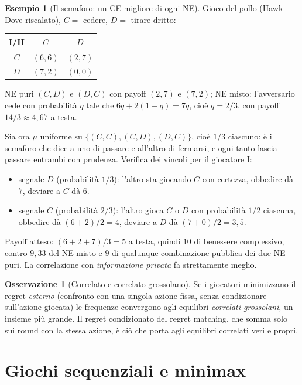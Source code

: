 \documentclass[12pt,a4paper,twoside]{book}
\theoremstyle{plain}
\theoremstyle{definition}
\newtheorem{example}[theorem]{Esempio}
\newtheorem{remark}[theorem]{Osservazione}
\begin{document}
\begin{example}[Il semaforo: un CE migliore di ogni NE]
Gioco del pollo (Hawk-Dove riscalato), $C=$ cedere, $D=$ tirare dritto:
\begin{center}
\begin{tabular}{c|cc}
I/II & $C$ & $D$\\\hline
$C$ & $(6,6)$ & $(2,7)$\\
$D$ & $(7,2)$ & $(0,0)$
\end{tabular}
\end{center}
NE puri $(C,D)$ e $(D,C)$ con payoff $(2,7)$ e $(7,2)$; NE misto: l'avversario
cede con probabilità $q$ tale che $6q+2(1-q)=7q$, cioè $q=2/3$, con payoff
$14/3\approx 4{,}67$ a testa.

Sia ora $\mu$ uniforme su $\{(C,C),(C,D),(D,C)\}$, cioè $1/3$ ciascuno: è il
semaforo che dice a uno di passare e all'altro di fermarsi, e ogni tanto lascia
passare entrambi con prudenza. Verifica dei vincoli per il giocatore I:
\begin{itemize}
  \item segnale $D$ (probabilità $1/3$): l'altro sta giocando $C$ con certezza,
        obbedire dà $7$, deviare a $C$ dà $6$. \checkmark
  \item segnale $C$ (probabilità $2/3$): l'altro gioca $C$ o $D$ con probabilità
        $1/2$ ciascuna, obbedire dà $(6+2)/2=4$, deviare a $D$ dà $(7+0)/2=3{,}5$.
        \checkmark
\end{itemize}
Payoff atteso: $(6+2+7)/3=5$ a testa, quindi $10$ di benessere complessivo, contro
$9{,}33$ del NE misto e $9$ di qualunque combinazione pubblica dei due NE puri.
La correlazione con \emph{informazione privata} fa strettamente meglio.
\end{example}

\begin{remark}[Correlato e correlato grossolano]
Se i giocatori minimizzano il regret \emph{esterno} (confronto con una singola
azione fissa, senza condizionare sull'azione giocata) le frequenze convergono agli
equilibri \emph{correlati grossolani}, un insieme più grande. Il regret
condizionato del regret matching, che somma solo sui round con la stessa azione,
è ciò che porta agli equilibri correlati veri e propri.
\end{remark}

\section{Giochi sequenziali e minimax}\label{sec:minimax-intro}
\end{document}
